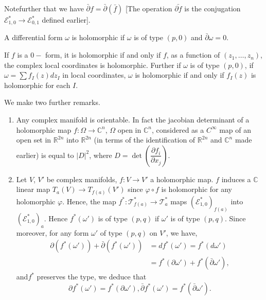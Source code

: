 Note\pageoriginale further that we have $\bar{\partial}  f = \bar{\partial}
(\bar{f})$ [The operation $\bar{\partial f} $ is the conjugation
  $\mathscr{E}^*_{1,0} \rightarrow \mathscr{E}^*_{0,1}$ defined
  earlier]. 

\begin{defi*}%
  A differential form $\omega$ is holomorphic if $\omega$ is of type
  $(p,0)$ and $\bar{\partial}  \omega = 0$. 
\end{defi*}

\begin{remark*}%
  If $f$ is a $0-$ form, it is holomorphic if and only if $f$, as a
  function of $(z_1, \ldots, z_n)$, the complex local coordinates is
  holomorphic. Further if $\omega$ is of type $(p, 0)$, if $\omega =
  \sum f_I (z) dz_I$ in local coordinates, $\omega$ is holomorphic if
  and only if $f_I(z)$ is holomorphic for each $I$. 
\end{remark*}

We make two further remarks.

\begin{enumerate}
\item Any complex manifold is orientable. In fact the jacobian
  determinant of a holomorphic map $f: \Omega \rightarrow
  \mathbb{C}^n$, $\Omega$ open in $\mathbb{C}^n$, considered as a
  $C^\infty$ map of an open set in $\mathbb{R}^{2n}$ into
  $\mathbb{R}^{2n}$ (in terms of the 
  identification of $\mathbb{R}^{2n}$ and $\mathbb{C}^n $ made
  earlier) 
  is equal to $|D|^2$, where $D = \det \left(\dfrac{\partial
    f_i}{\partial x_j}\right)$.	 
\item Let $V$, $V'$ be complex manifolds, $f: V \rightarrow V'$ a
  holomorphic map. $f$ induces a $\mathbb{C}$ linear map $T_a (V)
  \rightarrow T_{f(a)}(V')$ since $\varphi \circ f$ is holomorphic for any
  holomorphic $\varphi$. Hence, the map $f^* : \mathscr{T}^*_{f (a)} \to
  \mathscr{T}^*_a$ maps $(\mathscr{E}^*_{1, 0})_{f(a)}$ into $(\mathscr{ 
    E}^*_{1, 0})_a$. Hence $f^*(\omega ')$ is of type $(p,q)$ if
  $\omega '$ is of type $(p,q)$. Since moreover, for any form $\omega
  '$ of type $(p,q)$ on $V'$, we have, 
  \begin{align*}
    \partial (f^*(\omega ')) + \bar{\partial}  (f^* (\omega ')) & = df^*
    (\omega ') = f^* (d \omega ') \\ 
    & = f^* (\partial \omega' ) + f^* (\bar{\partial} \omega'),
  \end{align*}
  and\pageoriginale $f^*$ preserves the type, we deduce that
  $$
  \partial f^* (\omega ') = f^* (\partial \omega '), \bar{\partial}  f^*
  (\omega') = f^* (\bar{\partial}  \omega'). 
  $$
\end{enumerate}

